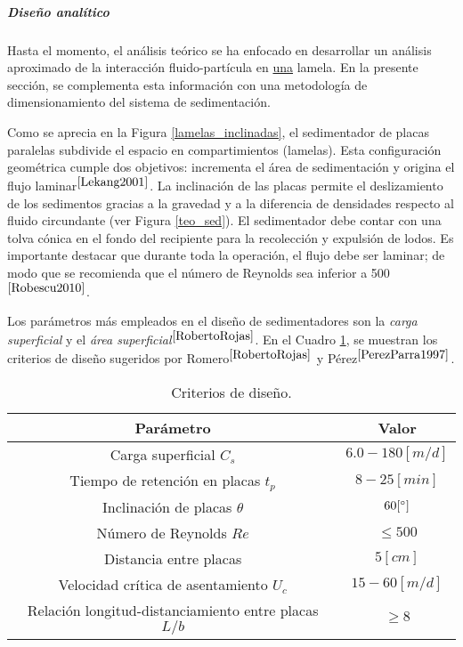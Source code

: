\subparagraph{Dise\~no anal\'itico}

\noindent
\justify

Hasta el momento, el an\'alisis te\'orico se ha enfocado en desarrollar un an\'alisis aproximado de la interacci\'on fluido-part\'icula en \underline{una} lamela. En la presente secci\'on, se complementa esta informaci\'on con una metodolog\'ia de dimensionamiento del sistema de sedimentaci\'on.

\noindent
\justify

Como se aprecia en la Figura \ref{lamelas_inclinadas}, el sedimentador de placas paralelas subdivide el espacio en compartimientos (lamelas). Esta configuraci\'on geom\'etrica cumple dos objetivos: incrementa el \'area de sedimentaci\'on y origina el flujo laminar$^{\cite{Lekang2001}}$. La inclinaci\'on de las placas permite el deslizamiento de los sedimentos gracias a la gravedad y a la diferencia de densidades respecto al fluido circundante (ver Figura \ref{teo_sed}). El sedimentador debe contar con una tolva c\'onica en el fondo del recipiente para la recolecci\'on y expulsi\'on de lodos. Es importante destacar que durante toda la operaci\'on, el flujo debe ser laminar; de modo que se recomienda que el n\'umero de Reynolds sea inferior a 500$^{\cite{Robescu2010}}$. 

\noindent
\justify

Los par\'ametros m\'as empleados en el dise\~no de sedimentadores son la \textit{carga superficial} y el \textit{\'area superficial}$^{\cite{RobertoRojas}}$. En el Cuadro \ref{critSed}, se muestran los criterios de dise\~no sugeridos por Romero$^{\cite{RobertoRojas}}$ y P\'erez$^{\cite{PerezParra1997}}$.

\begin{table}[h!]
	\centering
	\begin{tabular}{|c|c|}
		\hline
		\textbf{Par\'ametro} & \textbf{Valor} \\ \hline
		Carga superficial $C_s$ & $6.0 - 180 [m/d]$ \\ \hline
		Tiempo de retenci\'on en placas $t_p$ & $8 - 25 [min]$ \\ \hline
		Inclinaci\'on de placas $\theta$ & $60 [\degree]$ \\ \hline
		N\'umero de Reynolds $Re$ & $\le 500$ \\ \hline
		Distancia entre placas & $5 [cm]$ \\ \hline
		Velocidad cr\'itica de asentamiento $U_{c}$ & $15 - 60 [m/d]$ \\ \hline
		Relaci\'on longitud-distanciamiento entre placas $L/b$ & $\ge 8$ \\ \hline
	\end{tabular}
	\caption{Criterios de dise\~no.}
	\label{critSed}
\end{table}

